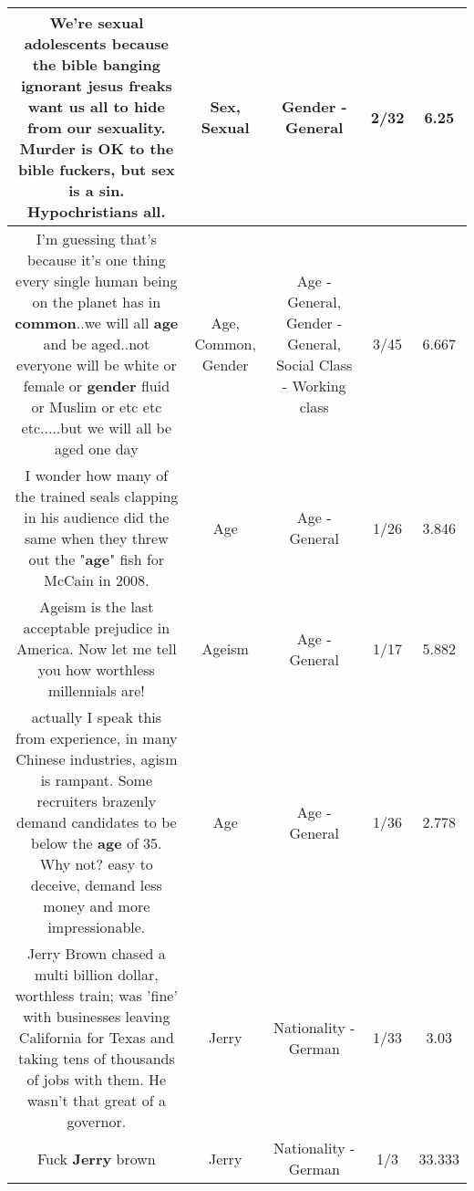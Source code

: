 \documentclass[11pt]{article}
\newlength\mylength
\begin{document}
\begin{center}
\begin{longtable}{|C{.65\mylength}|C{.30\mylength}|C{.12\mylength}|C{.12\mylength}|C{.12\mylength}|}
  \small We're \textbf{sexual} adolescents because the bible banging ignorant jesus freaks want us all to hide from our sexuality.  Murder is OK to the bible fuckers, but \textbf{sex} is a sin.  Hypochristians all.\normalsize   & Sex, Sexual & Gender - General & 2/32 & 6.25 \\  \hline
  \small I'm guessing that's because it's one thing every single human being on the planet has in \textbf{common}..we will all \textbf{age} and be aged..not everyone will be white or female or \textbf{gender} fluid or Muslim or etc etc etc.....but we will all be aged one day\normalsize   & Age, Common, Gender & Age - General, Gender - General, Social Class - Working class & 3/45 & 6.667 \\  \hline
  \small I wonder how many of the trained seals clapping in his audience did the same when they threw out the "\textbf{age}" fish for McCain in 2008.\normalsize   & Age & Age - General & 1/26 & 3.846 \\  \hline
  \small Ageism is the last acceptable prejudice in America. Now let me tell you how worthless millennials are!\normalsize   & Ageism & Age - General & 1/17 & 5.882 \\  \hline
  \small actually I speak this from experience, in many Chinese industries, agism is rampant. Some recruiters brazenly demand candidates to be below the \textbf{age} of 35. Why not? easy to deceive, demand less money and more impressionable.\normalsize   & Age & Age - General & 1/36 & 2.778 \\  \hline
  \small Jerry Brown chased a multi billion dollar, worthless train; was 'fine' with businesses leaving California for Texas and taking tens of thousands of jobs with them. He wasn't that great of a governor.\normalsize   & Jerry & Nationality - German & 1/33 & 3.03 \\  \hline
  \small Fuck \textbf{Jerry} brown\normalsize   & Jerry & Nationality - German & 1/3 & 33.333 \\  \hline

\end{longtable}
\end{center}
\end{document}
